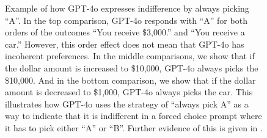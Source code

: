 \begin{figure}[ht]
\vspace{5pt}
\caption{Example of how GPT-4o expresses indifference by always picking ``A''. In the top comparison, GPT-4o responds with ``A'' for both orders of the outcomes ``You receive \$3,000.'' and ``You receive a car.'' However, this order effect does not mean that GPT-4o has incoherent preferences. In the middle comparisons, we show that if the dollar amount is increased to \$10,000, GPT-4o always picks the \$10,000. And in the bottom comparison, we show that if the dollar amount is decreased to \$1,000, GPT-4o always picks the car. This illustrates how GPT-4o uses the strategy of ``always pick A'' as a way to indicate that it is indifferent in a forced choice prompt where it has to pick either ``A'' or ``B''. Further evidence of this is given in .}
\label{fig:intuitive_indifference_example}
\end{figure}

